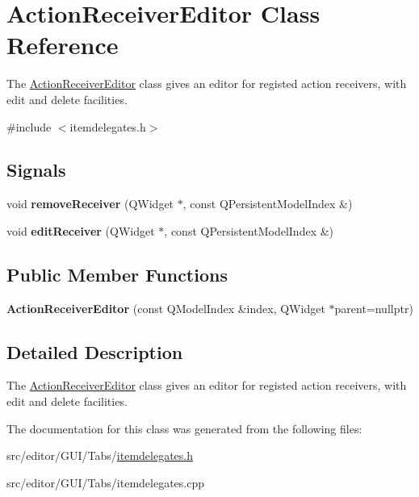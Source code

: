 \hypertarget{class_action_receiver_editor}{\section{\-Action\-Receiver\-Editor \-Class \-Reference}
\label{class_action_receiver_editor}
}


\-The \hyperlink{class_action_receiver_editor}{\-Action\-Receiver\-Editor} class gives an editor for registed action receivers, with edit and delete facilities.  




{\ttfamily \#include $<$itemdelegates.\-h$>$}

\subsection*{\-Signals}
\begin{DoxyCompactItemize}
\item 
\hypertarget{class_action_receiver_editor_a0836eac60a8f71a503ef68f9302698f6}{void {\bfseries remove\-Receiver} (\-Q\-Widget $\ast$, const \-Q\-Persistent\-Model\-Index \&)}\label{class_action_receiver_editor_a0836eac60a8f71a503ef68f9302698f6}

\item 
\hypertarget{class_action_receiver_editor_a02e438fa2da58fcda6009177bab86b7d}{void {\bfseries edit\-Receiver} (\-Q\-Widget $\ast$, const \-Q\-Persistent\-Model\-Index \&)}\label{class_action_receiver_editor_a02e438fa2da58fcda6009177bab86b7d}

\end{DoxyCompactItemize}
\subsection*{\-Public \-Member \-Functions}
\begin{DoxyCompactItemize}
\item 
\hypertarget{class_action_receiver_editor_aded035da4a8400d1dcca71b83ba1080c}{{\bfseries \-Action\-Receiver\-Editor} (const \-Q\-Model\-Index \&index, \-Q\-Widget $\ast$parent=nullptr)}\label{class_action_receiver_editor_aded035da4a8400d1dcca71b83ba1080c}

\end{DoxyCompactItemize}


\subsection{\-Detailed \-Description}
\-The \hyperlink{class_action_receiver_editor}{\-Action\-Receiver\-Editor} class gives an editor for registed action receivers, with edit and delete facilities. 

\-The documentation for this class was generated from the following files\-:\begin{DoxyCompactItemize}
\item 
src/editor/\-G\-U\-I/\-Tabs/\hyperlink{itemdelegates_8h}{itemdelegates.\-h}\item 
src/editor/\-G\-U\-I/\-Tabs/itemdelegates.\-cpp\end{DoxyCompactItemize}
